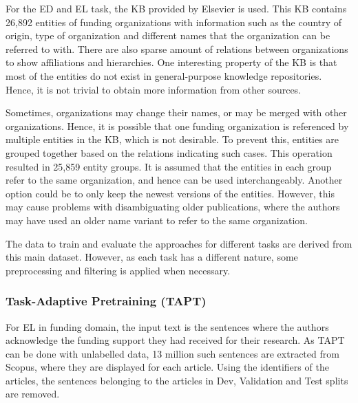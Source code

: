 \documentclass{report}
\theoremstyle{definition}
\theoremstyle{remark}
\begin{document}
For the ED and EL task, the KB provided by Elsevier is used. This KB contains 26,892 entities of funding organizations with information such as the country of origin, type of organization and different names that the organization can be referred to with. There are also sparse amount of relations between organizations to show affiliations and hierarchies. One interesting property of the KB is that most of the entities do not exist in general-purpose knowledge repositories. Hence, it is not trivial to obtain more information from other sources.

Sometimes, organizations may change their names, or may be merged with other organizations. Hence, it is possible that one funding organization is referenced by multiple entities in the KB, which is not desirable. To prevent this, entities are grouped together based on the relations indicating such cases. This operation resulted in 25,859 entity groups. It is assumed that the entities in each group refer to the same organization, and hence can be used interchangeably. Another option could be to only keep the newest versions of the entities. However, this may cause problems with disambiguating older publications, where the authors may have used an older name variant to refer to the same organization.

The data to train and evaluate the approaches for different tasks are derived from this main dataset. However, as each task has a different nature, some preprocessing and filtering is applied when necessary. 
\subsubsection{Task-Adaptive Pretraining (TAPT)}
For EL in funding domain, the input text is the sentences where the authors acknowledge the funding support they had received for their research. As TAPT can be done with unlabelled data, 13 million such sentences are extracted from Scopus, where they are displayed for each article. Using the identifiers of the articles, the sentences belonging to the articles in Dev, Validation and Test splits are removed.
\end{document}
